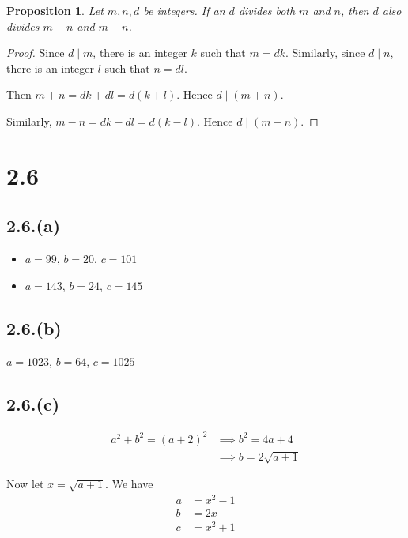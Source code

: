 \documentclass[letterpaper, 12pt, oneside]{memoir}
\theoremstyle{mystyle}
\newtheorem*{prop}{Proposition}
\begin{document}
\begin{prop}
    Let $m,n, d$ be integers. If an $d$ divides both $m$ and $n$, then $d$ also
    divides $m-n$ and $m+n$.
\end{prop}

\begin{proof}
    Since $d \mid m$, there is an integer $k$ such that $m = dk$. Similarly,
    since $d \mid n$, there is an integer $l$ such that $n = dl$.
    
    Then $m+n = dk+dl = d(k+l)$. Hence $d \mid (m+n)$.
    
    Similarly, $m-n = dk-dl = d(k-l)$. Hence $d \mid (m-n)$.
\end{proof}


\section*{2.6}

\subsection*{2.6.(a)}
\begin{itemize}
  \item $a=99$, $b=20$, $c=101$
  \item $a=143$, $b=24$, $c=145$
\end{itemize}

\subsection*{2.6.(b)}
    $a=1023$, $b=64$, $c=1025$
    
\subsection*{2.6.(c)}
\begin{align*}
    a^2 + b^2 = (a+2)^2 &\implies b^2 = 4a + 4  \\
                    &\implies b = 2 \sqrt{a+1}
\end{align*}

Now let $x = \sqrt{a+1}$. We have
\begin{align*}
    a &= x^2 - 1 \\
    b &= 2x \\
    c &= x^2 + 1   
\end{align*}
\end{document}
